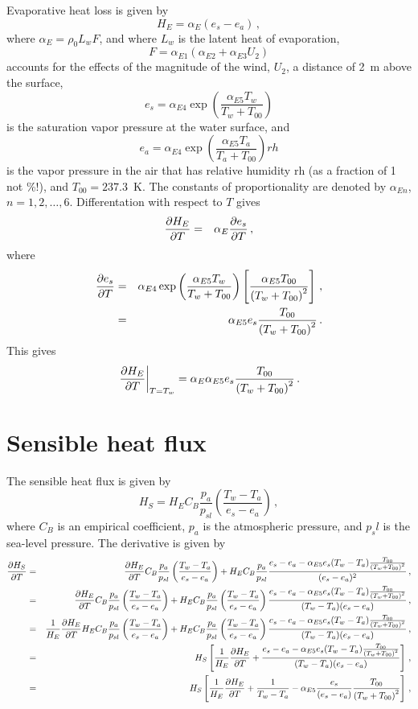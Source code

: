 \documentclass[12pt]{article}
\begin{document}
Evaporative heat loss is given by
\[
H_E = \alpha_E (e_s - e_a)\,,
\]
where $\alpha_E = \rho_0 L_w F$, and where $L_w$ is the latent heat of evaporation, 
\[
F = \alpha_{E1} (\alpha_{E2} + \alpha_{E3} U_2)
\]
accounts for the effects of the magnitude of the wind, $U_2$, a distance
of 2~m above the surface, 
\[
e_s = \alpha_{E4} \exp\left(\frac{\alpha_{E5} T_w}{T_w + T_{00}}\right)
\]
is the saturation vapor pressure at the water surface, and
\[
e_a = \alpha_{E4} \exp\left(\frac{\alpha_{E5} T_a}{T_a + T_{00}}\right) rh
\]
is the vapor pressure in the air that has relative humidity rh (as a fraction of 1 not \%!),
and $T_{00}=237.3$~K.
The constants of proportionality are denoted by $\alpha_{En}$, $n=1,2,\dots,6$.  Differentation with
respect to $T$ gives
\begin{eqnarray*}
\frac{\partial{H_E}}{\partial{T}} &=& \alpha_E\frac{\partial{e_s}}{\partial{T}}\,,
\end{eqnarray*}
where 
\begin{eqnarray*}
\frac{\partial{e_s}}{\partial{T}} &=& \alpha_{E4}\exp\left(\frac{\alpha_{E5} T_w}{T_w + T_{00}}\right)
\left[\frac{\alpha_{E5}T_{00}}{\left(T_w + T_{00}\right)^2}\right]\,,\\
           &=& \alpha_{E5}e_s\frac{T_{00}}{\left(T_w + T_{00}\right)^2}\,.
\end{eqnarray*}
This gives
\[
\left.\frac{\partial{H_E}}{\partial{T}}\right|_{T=T_w} = \alpha_E\alpha_{E5}e_s\frac{T_{00}}{\left(T_w + T_{00}\right)^2}\,.
\]

\section{Sensible heat flux}

The sensible heat flux is given by
\[
H_S = H_E C_B \frac{p_a}{p_{sl}}\left(\frac{T_w - T_a}{e_s - e_a}\right)\,,
\]
where $C_B$ is an empirical coefficient, $p_a$ is the atmospheric pressure, and
$p_sl$ is the sea-level pressure. The derivative is given by
\begin{eqnarray*}
\frac{\partial{H_S}}{\partial{T}} &=& \frac{\partial{H_E}}{\partial{T}} C_B \frac{p_a}{p_{sl}}\left(\frac{T_w - T_a}{e_s - e_a}\right)
+ H_E C_B \frac{p_a}{p_{sl}}
\frac{e_s - e_a - \alpha_{E5}e_s(T_w-T_a)\frac{T_{00}}{\left(T_w + T_{00}\right)^2}}{(e_s-e_a)^2}\,,\\
&=& \frac{\partial{H_E}}{\partial{T}} C_B \frac{p_a}{p_{sl}}\left(\frac{T_w - T_a}{e_s - e_a}\right)
+ H_E C_B \frac{p_a}{p_{sl}}\left(\frac{T_w-T_a}{e_s-e_a}\right)
\frac{e_s - e_a - \alpha_{E5}e_s(T_w-T_a)\frac{T_{00}}{\left(T_w + T_{00}\right)^2}}{(T_w-T_a)(e_s-e_a)}\,,\\
&=& \frac{1}{H_E}\frac{\partial{H_E}}{\partial{T}} H_E C_B \frac{p_a}{p_{sl}}\left(\frac{T_w - T_a}{e_s - e_a}\right)
+ H_E C_B \frac{p_a}{p_{sl}}\left(\frac{T_w-T_a}{e_s-e_a}\right)
\frac{e_s - e_a - \alpha_{E5}e_s(T_w-T_a)\frac{T_{00}}{\left(T_w + T_{00}\right)^2}}{(T_w-T_a)(e_s-e_a)}\,,\\
&=& H_S\left[\frac{1}{H_E}\frac{\partial{H_E}}{\partial{T}}+
\frac{e_s - e_a - \alpha_{E5}e_s(T_w-T_a)\frac{T_{00}}{\left(T_w + T_{00}\right)^2}}{(T_w-T_a)(e_s-e_a)}\right]\,,\\
&=& H_S\left[\frac{1}{H_E}\frac{\partial{H_E}}{\partial{T}}+
\frac{1}{T_w-T_a} - \alpha_{E5}\frac{e_s}{(e_s-e_a)}\frac{T_{00}}{\left(T_w + T_{00}\right)^2}\right]\,,\\
\end{eqnarray*}
\end{document}
